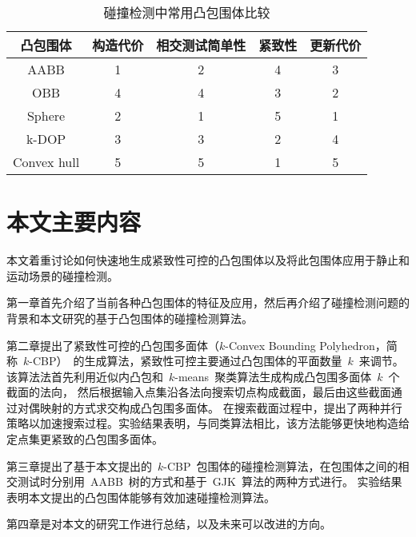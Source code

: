 \begin{table}[H]
\centering
\caption{碰撞检测中常用凸包围体比较}
\begin{tabular}{ccccc}
\toprule[1.5pt]
凸包围体 & 构造代价 & 相交测试简单性 & 紧致性 & 更新代价\\
\midrule[1.0pt]
AABB   & 1 & 2 & 4 & 3\\
OBB    & 4 & 4 & 3 & 2\\
Sphere & 2 & 1 & 5 & 1\\
k-DOP  & 3 & 3 & 2 & 4\\
Convex hull & 5 & 5 & 1 & 5 \\
\bottomrule[1.5pt]
\end{tabular}
\label{lbl:table:bv-comp}
\end{table}


\section{本文主要内容}
\label{sec:structure}
本文着重讨论如何快速地生成紧致性可控的凸包围体以及将此包围体应用于静止和运动场景的碰撞检测。

第一章首先介绍了当前各种凸包围体的特征及应用，然后再介绍了碰撞检测问题的背景和本文研究的基于凸包围体的碰撞检测算法。

第二章提出了紧致性可控的凸包围多面体（$k$-Convex Bounding Polyhedron，简称~$k$-CBP）~的生成算法，紧致性可控主要通过凸包围体的平面数量~$k$~来调节。
该算法法首先利用近似内凸包和~$k$-means~聚类算法生成构成凸包围多面体~$k$~个截面的法向，
然后根据输入点集沿各法向搜索切点构成截面，最后由这些截面通过对偶映射的方式求交构成凸包围多面体。
在搜索截面过程中，提出了两种并行策略以加速搜索过程。实验结果表明，与同类算法相比，该方法能够更快地构造给定点集更紧致的凸包围多面体。

第三章提出了基于本文提出的~$k$-CBP~包围体的碰撞检测算法，在包围体之间的相交测试时分别用~AABB~树的方式和基于~GJK~算法的两种方式进行。
实验结果表明本文提出的凸包围体能够有效加速碰撞检测算法。

第四章是对本文的研究工作进行总结，以及未来可以改进的方向。
